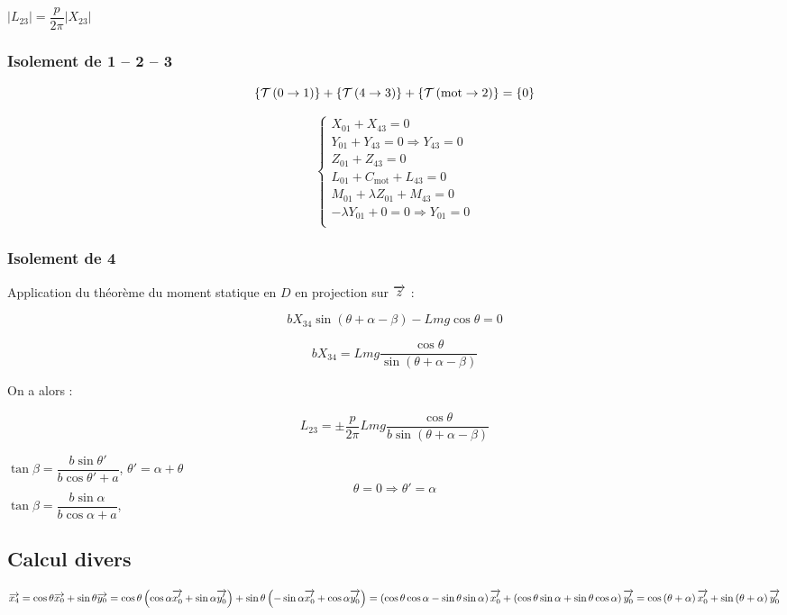 \documentclass[10pt,fleqn]{article} %
\begin{document}
$|L_{23}|=\dfrac{p}{2\pi}|X_{23}|$


\subsubsection*{Isolement de 1 -- 2 -- 3}

$$
\left\{\mathcal{T} \left(0\rightarrow 1 \right) \right\}+\left\{\mathcal{T} \left(4\rightarrow 3 \right) \right\}+\left\{\mathcal{T} \left(\text{mot}\rightarrow 2 \right) \right\} = \{0\}
$$


$$
\left\{
\begin{array}{l}
X_{01} +  X_{43}= 0\\
Y_{01} + Y_{43} = 0 \Rightarrow  Y_{43} = 0  \\
Z_{01} + Z_{43} = 0\\
L_{01} + C_{\text{mot}} + L_{43} = 0\\
M_{01}+\lambda Z_{01} + M_{43} = 0\\
-\lambda Y_{01}  + 0= 0 \Rightarrow Y_{01} = 0\\
\end{array}
\right.
$$


\subsubsection*{Isolement de 4}

Application du théorème du moment statique en $D$ en projection sur $\overrightarrow{z}$ :

$$ b  X_{34} \sin \left(\theta + \alpha -\beta\right)    -Lmg \cos \theta = 0
$$

$$ b  X_{34}   = Lmg \dfrac{\cos \theta}{\sin \left(\theta + \alpha -\beta\right)} 
$$

On a alors :

$$   L_{23}   = \pm \dfrac{p}{2\pi} Lmg \dfrac{\cos \theta}{b \sin \left(\theta + \alpha -\beta\right)} 
$$

$\tan\beta = \dfrac{ b \sin \theta' }{b \cos\theta' + a}$, 
$\theta' = \alpha + \theta$
$$\theta=0 \Rightarrow \theta' = \alpha $$
 $\tan\beta = \dfrac{ b \sin \alpha}{b \cos\alpha + a}$, 
\subsection{Calcul divers}

$\overrightarrow{x_4}  
= \cos \theta \overrightarrow{x_0} + \sin \theta \overrightarrow{y_0} 
= \cos \theta \left( \cos \alpha \overrightarrow{x_0'} + \sin \alpha \overrightarrow{y_0'} \right) + \sin \theta \left(
-\sin \alpha \overrightarrow{x_0'} + \cos \alpha \overrightarrow{y_0'} 
 \right)
 = \left(\cos \theta \cos \alpha -\sin \theta \sin \alpha \right)\overrightarrow{x_0'} + \left(\cos \theta \sin \alpha  + \sin \theta \cos \alpha \right)\overrightarrow{y_0'} 
  = \cos \left(\theta + \alpha \right)\overrightarrow{x_0'} + \sin \left(\theta + \alpha \right)\overrightarrow{y_0'} 
$
\end{document}
